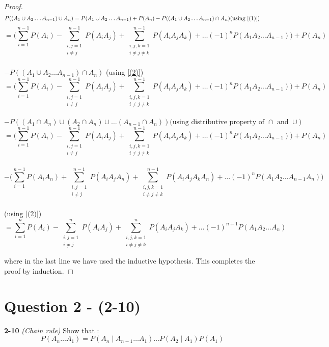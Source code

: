 \documentclass{article}
\begin{document}
\begin{proof}
	$$P((A_1 \cup A_2 \dots A_{n-1}) \cup A_n) = P(A_1 \cup A_2 \dots A_{n-1}) + P(A_n) - P((A_1 \cup A_2 \dots A_{n-1}) \cap A_n) \text{(using \ref{(1)})}$$
	$$= \Big(\sum_{i=1}^{n-1}P(A_i) - \sum_{\substack{i,j =1 \\ i \neq j}}^{n-1}P(A_i A_j) + \sum_{\substack{i,j,k = 1  \\ i \neq j \neq k}}^{n-1}P(A_i A_j A_k) + \dots   (-1)^{n}P(A_1 A_2 \dots A_{n-1})\Big) + P(A_n)$$ \\  $   - P((A_1 \cup A_2 \dots A_{n-1}) \cap A_n) $  (using \ref{(2)})\\
	$$= \Big(\sum_{i=1}^{n-1}P(A_i) - \sum_{\substack{i,j =1 \\ i \neq j}}^{n-1}P(A_i A_j) + \sum_{\substack{i,j,k = 1  \\ i \neq j \neq k}}^{n-1}P(A_i A_j A_k) + \dots   (-1)^{n}P(A_1 A_2 \dots A_{n-1})\Big) + P(A_n)$$ \\  $   - P((A_1 \cap A_n) \cup (A_2 \cap A_n) \cup \dots (A_{n-1} \cap A_n)) \text{(using distributive property of $\cap$ and $\cup$)}$ \\
	$$= \Big(\sum_{i=1}^{n-1}P(A_i) - \sum_{\substack{i,j =1 \\ i \neq j}}^{n-1}P(A_i A_j) + \sum_{\substack{i,j,k = 1  \\ i \neq j \neq k}}^{n-1}P(A_i A_j A_k) + \dots   (-1)^{n}P(A_1 A_2 \dots A_{n-1})\Big) + P(A_n)$$ \\  $$   - \Big(\sum_{i=1}^{n-1}P(A_i  A_n) + \sum_{\substack{i,j =1 \\ i \neq j}}^{n-1}P(A_i A_j A_n) + \sum_{\substack{i,j,k = 1  \\ i \neq j \neq k}}^{n-1}P(A_i A_j A_k A_n) + \dots (-1)^{n}P(A_1 A_2 \dots A_{n-1} A_n)\Big)$$\\  (using \ref{(2)})\\
	$$ =\sum_{i=1}^{n}P(A_i)  -  \sum_{\substack{i,j =1 \\ i \neq j}}^{n}P(A_i A_j)  +  \sum_{\substack{i,j,k = 1 \\ i \neq j \neq k}}^{n}P(A_i A_j A_k)  +  \dots   (-1)^{n+1}P(A_1 A_2 \dots A_n) $$
		
where in the last line we have used the inductive hypothesis. This completes the proof by induction.
\end{proof}
\section{Question 2 - (2-10)}
\label{Q2}
\textbf{2-10} \textit{(Chain rule)} Show that  : \\
\begin{equation*}
	P(A_n \dots A_1) = P(A_n \mid A_{n-1} \dots A_1) \dots P(A_2 \mid A_1)P(A_1)
\end{equation*}
\end{document}
